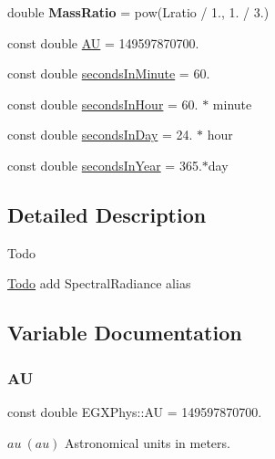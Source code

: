 \begin{DoxyCompactItemize}
\item 
\mbox{\label{namespace_e_g_x_phys_acc77a9f1a840501ce0b646123a8ae2ae}} 
double {\bfseries Mass\+Ratio} = pow(Lratio / 1., 1. / 3.)
\item 
const double \mbox{\hyperlink{namespace_e_g_x_phys_a999332303a2214425184fbe23dbae0c5}{AU}} = 149597870700.
\item 
const double \mbox{\hyperlink{namespace_e_g_x_phys_a65038e0b58235dc59a44cec16638df35}{seconds\+In\+Minute}} = 60.
\item 
const double \mbox{\hyperlink{namespace_e_g_x_phys_a9a6a4eb13636aa068a3f1e41cde4d6fd}{seconds\+In\+Hour}} = 60. $\ast$ minute
\item 
const double \mbox{\hyperlink{namespace_e_g_x_phys_ab4f86327f64403b843077ecc189ce52b}{seconds\+In\+Day}} = 24. $\ast$ hour
\item 
const double \mbox{\hyperlink{namespace_e_g_x_phys_aac13efe8296819409bde4a0a8691d56a}{seconds\+In\+Year}} = 365.$\ast$day
\end{DoxyCompactItemize}


\subsection{Detailed Description}
\begin{DoxyRefDesc}{Todo}
\item[\mbox{\hyperlink{todo__todo000009}{Todo}}]add Spectral\+Radiance alias \end{DoxyRefDesc}


\subsection{Variable Documentation}
\mbox{\label{namespace_e_g_x_phys_a999332303a2214425184fbe23dbae0c5}} 
\subsubsection{\texorpdfstring{AU}{AU}}
{\footnotesize\ttfamily const double E\+G\+X\+Phys\+::\+AU = 149597870700.}

$au\ (au)$ Astronomical units in meters. \mbox{\label{namespace_e_g_x_phys_a932fff28fce4321fdbf9abc5c1783dc9}} 
